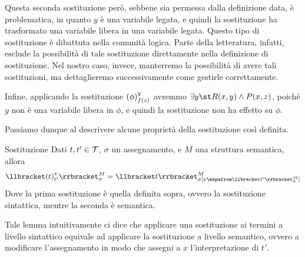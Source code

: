 Questa seconda sostituzione però, sebbene sia permessa dalla definizione data, è problematica, in quanto \(y\) è una variabile legata, e quindi la sostituzione ha trasformato una variabile libera in una variabile legata. Questo tipo di sostituzione è dibattuta nella comunità logica. Parte della letteratura, infatti, esclude la possibilità di tale sostituzione direttamente nella definizione di sostituzione. Nel nostro caso, invece, manterremo la possibilità di avere tali sostituzioni, ma dettaglieremo successivamente come gestirle correttamente.

Infine, applicando la sostituzione \({{\left(\phi\right)}^{y}_{f(z)}}\) avremmo \(\exists y\st R(x,y) \land P(x,z)\), poiché \(y\) non è una variabile libera in \(\phi\), e quindi la sostituzione non ha effetto su \(\phi\).

Passiamo dunque al descrivere alcune proprietà della sostituzione così definita.

\begin{lemma}{Sostituzione}
  Dati \(t, t' \in \mathcal{T}\), \(\sigma\) un assegnamento, e \(M\) una struttura semantica, allora
  \[\den{{\subs{t}{x}{t'}} }[M][\sigma] = \den{t}[M][\sigma[x \mapsfrom \den{t'}[M][\sigma]]]\]
  Dove la prima sostituzione è quella definita sopra, ovvero la sostituzione sintattica, mentre la seconda è semantica.
\end{lemma}

Tale lemma intuitivamente ci dice che applicare una sostituzione ai termini a livello sintattico equivale ad applicare la sostituzione a livello semantico, ovvero a modificare l'assegnamento in modo che assegni a \(x\) l'interpretazione di \(t'\).


